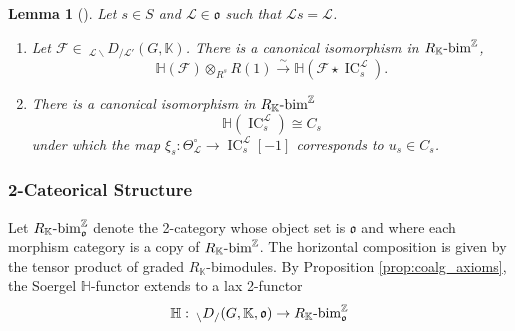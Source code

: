 \documentclass{amsart}
\newcommand{\Z}{\mathbb{Z}}
\newcommand{\K}{\mathbb{K}}
\renewcommand{\H}{\mathbb{H}}
\newcommand{\scrF}{\mathcal{F}}
\newcommand{\scrL}{\mathcal{L}}
\newcommand{\grbim}[1]{#1\textnormal{-bim}^{\Z}}
\DeclareMathOperator{\IC}{IC}
\newcommand{\fr}[1]{\mathfrak{#1}}
\newcommand{\DEE}[2]{\:_{#1 \backslash} D_{/ #2} }
\newtheorem{lemma}[subsubsection]{Lemma}
\theoremstyle{definition}
\numberwithin{equation}{subsection}
\begin{document}
\begin{lemma}[{\cite[Lemma 7.4]{LY}}]\label{lem:H_conv_by_ICs}
    Let $s \in S$ and $\scrL \in \fr{o}$ such that $\scrL s = \scrL$.
    \begin{enumerate}
        \item Let $\scrF \in \DEE{\scrL}{\scrL'} (G, \K)$.
            There is a canonical isomorphism in $\grbim{R_{\K}}$,
            \begin{equation}\label{eq:H_conv_by_ICs_1}
                \H (\scrF) \otimes_{R^s} R(1) \stackrel{\sim}{\to} \H (\scrF \star \IC_s^{\scrL}).
            \end{equation}
        \item There is a canonical isomorphism in $\grbim{R_{\K}}$
        \begin{equation}\label{eq:H_conv_by_ICs_3}
            \H (\IC_s^{\scrL}) \cong C_s
        \end{equation}
        under which the map $\xi_s : \Theta_{\scrL}^{\circ} \to \IC_s^{\scrL} [-1]$ corresponds to $u_s \in C_s$. 
    \end{enumerate}
\end{lemma}

\subsubsection{2-Cateorical Structure}

Let $\grbim{R_{\K}}_{\fr{o}}$ denote the 2-category whose object set is $\fr{o}$ and where each morphism category is a copy of $\grbim{R_{\K}}$.
The horizontal composition is given by the tensor product of graded $R_{\K}$-bimodules.
By Proposition \ref{prop:coalg_axioms}, the Soergel $\H$-functor extends to a lax 2-functor
\[\H : \DEE{}{} (G, \K, \fr{o}) \to \grbim{R_{\K}}_{\fr{o}}\]
\end{document}

